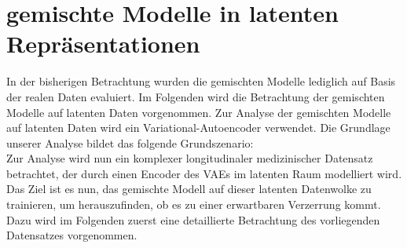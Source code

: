 \documentclass[%
thesis=student,%
coverpage=false,%
titlepage=false,%
headmarks=true, %
german,%
font=libertine, %
math=newpxtx, %
BCOR=5mm,%
coverBCOR=11mm%
]{tumbook}
\theoremstyle{break}
\begin{document}
\section{gemischte Modelle in latenten Repräsentationen}
In der bisherigen Betrachtung wurden die gemischten Modelle lediglich auf Basis der realen Daten evaluiert. Im Folgenden wird die Betrachtung der gemischten Modelle auf latenten Daten vorgenommen. Zur Analyse der gemischten Modelle auf latenten Daten wird ein Variational-Autoencoder verwendet. Die Grundlage unserer Analyse bildet das folgende Grundszenario: \\
Zur Analyse wird nun ein komplexer longitudinaler medizinischer Datensatz betrachtet, der durch einen Encoder des VAEs im latenten Raum modelliert wird. Das Ziel ist es nun, das gemischte Modell auf dieser latenten Datenwolke zu trainieren, um herauszufinden, ob es zu einer erwartbaren Verzerrung kommt. Dazu wird im Folgenden zuerst eine detaillierte Betrachtung des vorliegenden Datensatzes vorgenommen.
\end{document}
